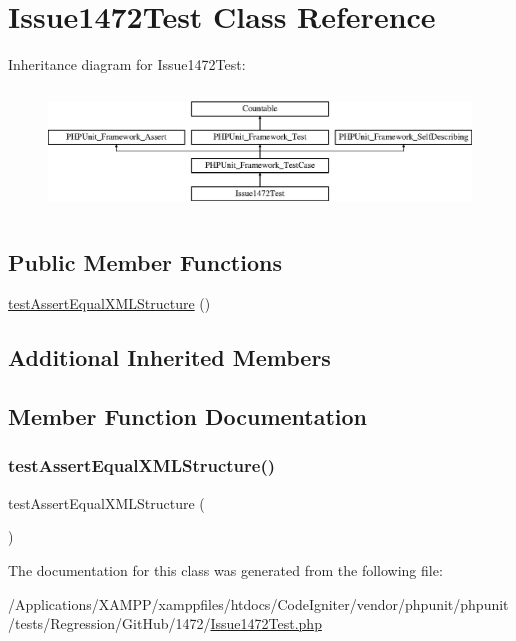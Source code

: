 \hypertarget{class_issue1472_test}{}\section{Issue1472\+Test Class Reference}
\label{class_issue1472_test}
Inheritance diagram for Issue1472\+Test\+:\begin{figure}[H]
\begin{center}
\leavevmode
\includegraphics[height=3.303835cm]{class_issue1472_test}
\end{center}
\end{figure}
\subsection*{Public Member Functions}
\begin{DoxyCompactItemize}
\item 
\mbox{\hyperlink{class_issue1472_test_a4199ce9c7b3ad2716cd65664234910f3}{test\+Assert\+Equal\+X\+M\+L\+Structure}} ()
\end{DoxyCompactItemize}
\subsection*{Additional Inherited Members}


\subsection{Member Function Documentation}
\mbox{\label{class_issue1472_test_a4199ce9c7b3ad2716cd65664234910f3}} 
\subsubsection{\texorpdfstring{test\+Assert\+Equal\+X\+M\+L\+Structure()}{testAssertEqualXMLStructure()}}
{\footnotesize\ttfamily test\+Assert\+Equal\+X\+M\+L\+Structure (\begin{DoxyParamCaption}{ }\end{DoxyParamCaption})}



The documentation for this class was generated from the following file\+:\begin{DoxyCompactItemize}
\item 
/\+Applications/\+X\+A\+M\+P\+P/xamppfiles/htdocs/\+Code\+Igniter/vendor/phpunit/phpunit/tests/\+Regression/\+Git\+Hub/1472/\mbox{\hyperlink{_issue1472_test_8php}{Issue1472\+Test.\+php}}\end{DoxyCompactItemize}
